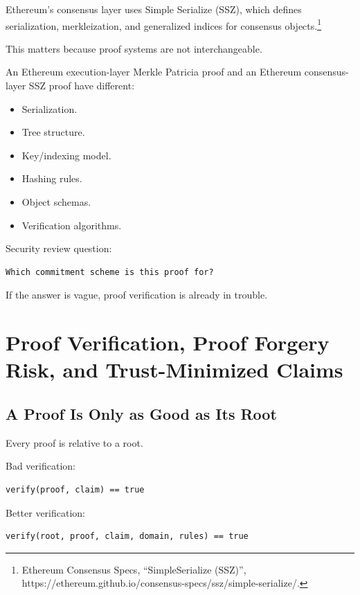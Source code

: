 Ethereum's consensus layer uses Simple Serialize (SSZ), which defines
serialization, merkleization, and generalized indices for consensus
objects.\footnote{Ethereum Consensus Specs, ``SimpleSerialize (SSZ)'',
  https://ethereum.github.io/consensus-specs/ssz/simple-serialize/.}

This matters because proof systems are not interchangeable.

An Ethereum execution-layer Merkle Patricia proof and an Ethereum
consensus-layer SSZ proof have different:

\begin{itemize}
\tightlist
\item
  Serialization.
\item
  Tree structure.
\item
  Key/indexing model.
\item
  Hashing rules.
\item
  Object schemas.
\item
  Verification algorithms.
\end{itemize}

Security review question:

\begin{lstlisting}
Which commitment scheme is this proof for?
\end{lstlisting}

If the answer is vague, proof verification is already in trouble.

\section{Proof Verification, Proof Forgery Risk, and Trust-Minimized Claims}

\subsection{A Proof Is Only as Good as Its Root}

Every proof is relative to a root.

Bad verification:

\begin{lstlisting}
verify(proof, claim) == true
\end{lstlisting}

Better verification:

\begin{lstlisting}
verify(root, proof, claim, domain, rules) == true
\end{lstlisting}


